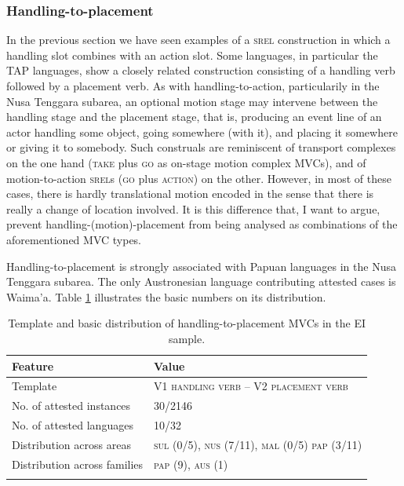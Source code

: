 \subsubsection{Handling-to-placement} \label{sec:handling-to-placement}
In the previous section we have seen examples of a \textsc{srel} construction in which a handling slot combines with an action slot. Some languages, in particular the \textsc{TAP} languages, show a closely related construction consisting of a handling verb followed by a placement verb. As with handling-to-action, particularily in the Nusa Tenggara subarea, an optional motion stage may intervene between the handling stage and the placement stage, that is, producing an event line of an actor handling some object, going somewhere (with it), and placing it somewhere or giving it to somebody. Such construals are reminiscent of transport complexes on the one hand (\textsc{take} plus \textsc{go} as on-stage motion complex MVCs), and of motion-to-action \textsc{srel}s (\textsc{go} plus \textsc{action}) on the other. However, in most of these cases, there is hardly translational motion encoded in the sense that there is really a change of location involved. It is this difference that, I want to argue, prevent handling-(motion)-placement from being analysed as combinations of the aforementioned MVC types.

Handling-to-placement is strongly associated with Papuan languages in the Nusa Tenggara subarea. The only Austronesian language contributing attested cases is Waima'a. Table \ref{table:handling-to-placement} illustrates the basic numbers on its distribution.

\begin{table}
\begin{tabular}{ll}
\lsptoprule
Feature&Value\tabularnewline
\hline
Template&V1 \textsc{handling verb} -- V2 \textsc{placement verb}\tabularnewline
No. of attested instances& 30/2146 \tabularnewline
No. of attested languages& 10/32 \tabularnewline
Distribution across areas& \textsc{sul} (0/5), \textsc{nus} (7/11), \textsc{mal} (0/5) \textsc{pap} (3/11) \tabularnewline
Distribution across families& \textsc{pap} (9), \textsc{aus} (1) \tabularnewline
\lspbottomrule
\end{tabular}
\caption[Template and basic distribution of handling-to-placement MVCs]{Template and basic distribution of handling-to-placement MVCs in the EI sample.}
\label{table:handling-to-placement}
\end{table}

